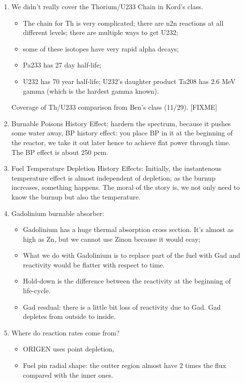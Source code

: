 \documentclass{school-22.211-notes}
\begin{document}
\clearpage
{}
\begin{enumerate}
 \item We didn't really cover the Thorium/U233 Chain in Kord's class. 
   \begin{itemize}
   \item The chain for Th is very complicated; there are n2n reactions at all different levels; there are multiple ways to get U232; 
   \item some of these isotopes have very rapid alpha decays; 
   \item Pa233 has 27 day half-life; 
   \item U232 has 70 year half-life; U232's daughter product Ta208 has 2.6 MeV gamma (which is the hardest gamma known). 
   \end{itemize}
   Coverage of Th/U233 comparison from Ben's class (11/29). [FIXME]


\item Burnable Poisons History Effect: hardern the spectrum, because it pushes some water away, BP history effect: you place BP in it at the beginning of the reactor, we take it out later hence to achieve flat power through time. The BP effect is about 250 pcm. 

\item Fuel Temperature Depletion History Effects: 
Initially, the instantenous temperature effect is almost independent of depletion; as the burnup increases, something happens. The moral of the story is, we not only need to know the burnup but also the temperature. 

\item Gadolinium burnable absorber: 
  \begin{itemize}
  \item Gadolinium has a huge thermal absorption cross section. It's almost as high as Zn, but we cannot use Zinon because it would ecay; 
  \item What we do with Gadolinium is to replace part of the fuel with Gad and reactivity would be flatter with respect to time. 
  \item Hold-down is the difference between the reactivity at the beginning of life-cycle. 
  \item Gad resdual: there is a little bit loss of reactivity due to Gad. Gad depletes from outside to inside. 
  \end{itemize}


\item Where do reaction rates come from? 
  \begin{itemize}
  \item ORIGEN uses point depletion, 
  \item Fuel pin radial shape: the outter region almost have 2 times the flux compared with the inner ones. 
  \end{itemize}


\end{enumerate}
\end{document}
